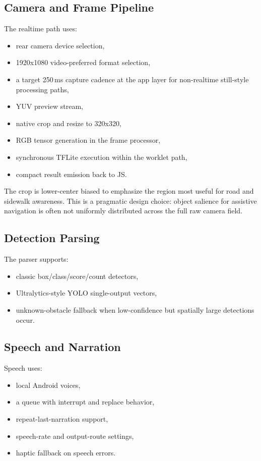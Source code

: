 \documentclass[conference]{IEEEtran}
\begin{document}
\subsection{Camera and Frame Pipeline}
The realtime path uses:
\begin{itemize}[leftmargin=1.2em]
\item rear camera device selection,
\item 1920x1080 video-preferred format selection,
\item a target 250\,ms capture cadence at the app layer for non-realtime still-style processing paths,
\item YUV preview stream,
\item native crop and resize to 320x320,
\item RGB tensor generation in the frame processor,
\item synchronous TFLite execution within the worklet path,
\item compact result emission back to JS.
\end{itemize}

The crop is lower-center biased to emphasize the region most useful for road and sidewalk awareness. This is a pragmatic design choice: object salience for assistive navigation is often not uniformly distributed across the full raw camera field.

\subsection{Detection Parsing}
The parser supports:
\begin{itemize}[leftmargin=1.2em]
\item classic box/class/score/count detectors,
\item Ultralytics-style YOLO single-output vectors,
\item unknown-obstacle fallback when low-confidence but spatially large detections occur.
\end{itemize}

\subsection{Speech and Narration}
Speech uses:
\begin{itemize}[leftmargin=1.2em]
\item local Android voices,
\item a queue with interrupt and replace behavior,
\item repeat-last-narration support,
\item speech-rate and output-route settings,
\item haptic fallback on speech errors.
\end{itemize}
\end{document}
